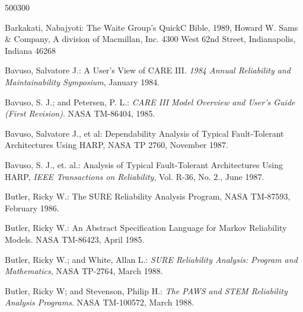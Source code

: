 \begin{fast_picture}{500}{300}
         \unsavBboxpos{}\savBboxpos{}
         \unsavBboxpos{}\savBboxpos{}
         \unsavBboxpos{}\savBboxpos{}
\nextAbox\savBboxpos{}
         \unsavBboxpos{}\savBboxpos{}
         \unsavBboxpos{}\savBboxpos{}
         \unsavBboxpos{}\savBboxpos{}
         \unsavBboxpos{}\savBboxpos{}
         \unsavBboxpos{}\savBboxpos{}
\end{fast_picture}

\begin{thebibliography}{25}

 Barkakati, Nabajyoti:
The Waite Group's QuickC Bible,
1989,
Howard W. Sams \& Company,
A division of Macmillan, Inc.
4300 West 62nd Street,
Indianapolis, Indiana 46268


 Bavuso, Salvatore J.:
A User's View of CARE III.  {\em 1984 Annual Reliability
and Maintainability Symposium}, January 1984.

  Bavuso, S. J.; and Petersen, P. L.:  {\em CARE III Model
Overview and User's Guide (First Revision)}.  NASA TM-86404, 1985.

 Bavuso, Salvatore J., et al:
Dependability Analysis of Typical Fault-Tolerant Architectures
Using HARP, NASA TP 2760, November 1987.

 Bavuso, S. J., et. al.: Analysis of Typical
Fault-Tolerant Architectures Using HARP, {\em IEEE Transactions on
Reliability}, Vol. R-36, No. 2., June 1987.


 Butler, Ricky W.:
The SURE Reliability Analysis Program, NASA TM-87593, February 1986.

 Butler, Ricky W.: An Abstract Specification Language
for Markov Reliability Models.  NASA TM-86423, April 1985.

 Butler, Ricky W.; and White, Allan L.: {\em SURE Reliability
Analysis: Program and Mathematics}, NASA TP-2764, March 1988.

 Butler, Ricky W; and Stevenson, Philip H.: {\em The PAWS and
STEM Reliability Analysis Programs}. NASA TM-100572, March 1988.


\end{thebibliography}
